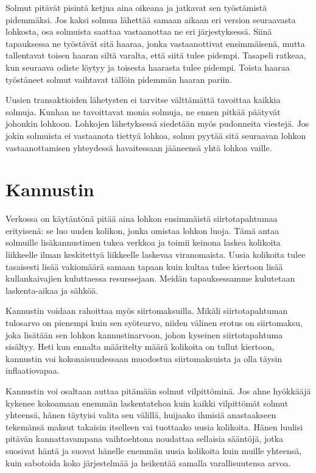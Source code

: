 \documentclass{article}
\begin{document}
Solmut pitävät pisintä ketjua aina oikeana ja jatkavat sen työstämistä pidemmäksi. Jos kaksi solmua lähettää samaan aikaan eri version seuraavasta lohkosta, osa solmuista saattaa vastaanottaa ne eri järjestyksessä. Siinä tapauksessa ne työstävät sitä haaraa, jonka vastaanottivat ensimmäisenä, mutta tallentavat toisen haaran siltä varalta, että siitä tulee pidempi. Tasapeli ratkeaa, kun seuraava odiste löytyy ja toisesta haarasta tulee pidempi. Toista haaraa työstäneet solmut vaihtavat tällöin pidemmän haaran pariin.

Uusien transaktioiden lähetysten ei tarvitse välttämättä tavoittaa kaikkia solmuja. Kunhan ne tavoittavat monia solmuja, ne ennen pitkää päätyvät johonkin lohkoon. Lohkojen lähetyksessä siedetään myös pudonneita viestejä. Jos jokin solmuista ei vastaanota tiettyä lohkoa, solmu pyytää sitä seuraavan lohkon vastaanottamisen yhteydessä havaitessaan jääneensä yhtä lohkoa vaille.


\section{Kannustin}

Verkossa on käytäntönä pitää aina lohkon ensimmäistä siirtotapahtumaa erityisenä: se luo uuden kolikon, jonka omistaa lohkon luoja. Tämä antaa solmuille lisäkannustimen tukea verkkoa ja toimii keinona laskea kolikoita liikkeelle ilman keskitettyä liikkeelle laskevaa viranomaista. Uusia kolikoita tulee tasaisesti lisää vakiomäärä samaan tapaan kuin kultaa tulee kiertoon lisää kullankaivajien kuluttaessa resurssejaan. Meidän tapauksessamme kulutetaan laskenta-aikaa ja sähköä.

Kannustin voidaan rahoittaa myös siirtomaksuilla. Mikäli siirtotapahtuman tulosarvo on pienempi kuin sen syötearvo, niiden välinen erotus on siirtomaksu, joka lisätään sen lohkon kannustinarvoon, johon kyseinen siirtotapahtuma sisältyy. Heti kun ennalta määritelty määrä kolikoita on tullut kiertoon, kannustin voi kokonaisuudessaan muodostua siirtomaksuista ja olla täysin inflaatiovapaa.

Kannustin voi osaltaan auttaa pitämään solmut vilpittöminä. Jos ahne hyök\-kää\-jä  kykenee kokoamaan enemmän laskentatehoa kuin kaikki vilpittömät solmut yhteensä, hänen täytyisi valita sen välillä, huijaako ihmisiä anastaakseen tekemänsä maksut takaisin itselleen vai tuottaako uusia kolikoita. Hänen luulisi pitävän kannattavampana vaihtoehtona noudattaa sellaisia sääntöjä, jotka suosivat häntä ja suovat hänelle enemmän uusia kolikoita kuin muille yhteensä, kuin sabotoida koko järjestelmää ja heikentää samalla varallisuutensa arvoa.
\end{document}
